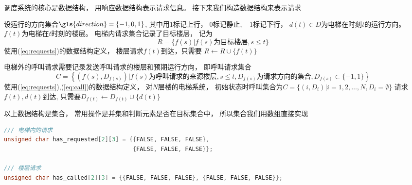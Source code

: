 \documentclass[../main.tex]{subfiles} %
\begin{document}
调度系统的核心是数据结构，
用响应数据结构表示请求信息。
接下来我们构造数据结构来表示请求

设运行的方向集合$\gls{direction} = \{-1,0,1\}$,
其中用$1$标记上行，
$0$标记静止,
$-1$标记下行，
$d(t) \in D$为电梯在时刻$t$的运行方向。
$f(t)$为电梯在$t$时刻的楼层。
电梯内请求集合记录了目标楼层，
记为
\begin{equation}
  R = \{f(s) | f(s) \text{为目标楼层},s \leq t \}
  \label{eq:requests}
\end{equation}
使用(\ref{eq:requests})的数据结构定义，
楼层请求$f(t)$到达，只需要
$R \gets R \cup \{f(t)\}$

电梯外的呼叫请求需要记录发送呼叫请求的楼层和预期运行方向，
即呼叫请求集合
\begin{equation}
  C = \left\{ (f(s),D_{f(s)}) |
  f(s) \text{为呼叫请求的来源楼层}, s \leq t,
  D_{f(s)} \text{为请求方向的集合}, D_{f(s)} \subset \{-1,1\}
  \right\}
  \label{eq:call}
\end{equation}
使用(\ref{eq:requests}),(\ref{eq:call})的数据结构定义，
对$N$层楼的电梯系统，
初始状态时呼叫集合为$C=\{(i,D_i)|i=1,2,\dots,N,D_i = \emptyset\}$
请求$f(t),d(t)$到达,
只需要$D_{f(t)} \gets D_{f(t)} \cup \{d(t)\}$

以上数据结构是集合，
常用操作是并集和判断元素是否在目标集合中，
所以集合我们用数组直接实现

\begin{lstlisting}[language=c]
/// 电梯内的请求
unsigned char has_requested[2][3] = {{FALSE, FALSE, FALSE},
                                     {FALSE, FALSE, FALSE}};

/// 楼层请求
unsigned char has_called[2][3] = {{FALSE, FALSE, FALSE}, {FALSE, FALSE, FALSE}};
\end{lstlisting}
\end{document}
